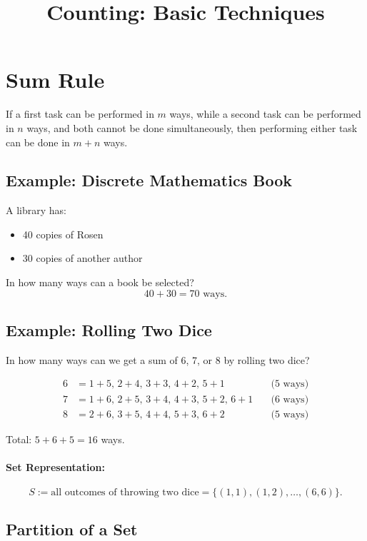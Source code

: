 \documentclass[11pt]{article}
\title{\textbf{Counting: Basic Techniques}}
\author{}
\date{}
\begin{document}
\maketitle

\section{Sum Rule}

If a first task can be performed in $m$ ways, while a second task can be performed in $n$ ways, and both cannot be done simultaneously, then performing either task can be done in $m + n$ ways.

\subsection*{Example: Discrete Mathematics Book}
A library has:
\begin{itemize}
    \item 40 copies of Rosen
    \item 30 copies of another author
\end{itemize}

In how many ways can a book be selected? 
\[
40 + 30 = 70 \text{ ways.}
\]

\subsection*{Example: Rolling Two Dice}
In how many ways can we get a sum of 6, 7, or 8 by rolling two dice?

\begin{align*}
6 &= 1 + 5, \, 2 + 4, \, 3 + 3, \, 4 + 2, \, 5 + 1 \quad &\text{(5 ways)} \\
7 &= 1 + 6, \, 2 + 5, \, 3 + 4, \, 4 + 3, \, 5 + 2, \, 6 + 1 \quad &\text{(6 ways)} \\
8 &= 2 + 6, \, 3 + 5, \, 4 + 4, \, 5 + 3, \, 6 + 2 \quad &\text{(5 ways)} 
\end{align*}

Total: $5 + 6 + 5 = 16$ ways.

\paragraph{Set Representation:}
\[
S := \text{all outcomes of throwing two dice} = \{(1,1), (1,2), \dots, (6,6)\}.
\]

\subsection{Partition of a Set}
\end{document}
